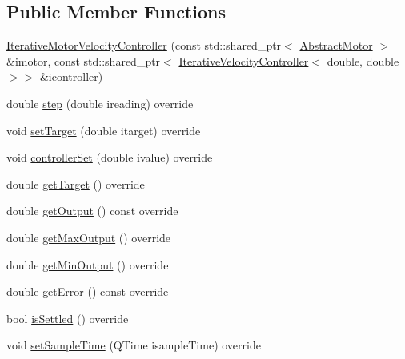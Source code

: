 \subsection*{Public Member Functions}
\begin{DoxyCompactItemize}
\item 
\mbox{\hyperlink{classokapi_1_1IterativeMotorVelocityController_a89b1a3956de3965a8552600283a1ec1b}{Iterative\+Motor\+Velocity\+Controller}} (const std\+::shared\+\_\+ptr$<$ \mbox{\hyperlink{classokapi_1_1AbstractMotor}{Abstract\+Motor}} $>$ \&imotor, const std\+::shared\+\_\+ptr$<$ \mbox{\hyperlink{classokapi_1_1IterativeVelocityController}{Iterative\+Velocity\+Controller}}$<$ double, double $>$$>$ \&icontroller)
\item 
double \mbox{\hyperlink{classokapi_1_1IterativeMotorVelocityController_a71f514d22293dc2e23de26ecd994d57c}{step}} (double ireading) override
\item 
void \mbox{\hyperlink{classokapi_1_1IterativeMotorVelocityController_a9a5a1d57df3faa75474245200ed34a18}{set\+Target}} (double itarget) override
\item 
void \mbox{\hyperlink{classokapi_1_1IterativeMotorVelocityController_a5a36064df12b3d34f2bfa09ca1992b9e}{controller\+Set}} (double ivalue) override
\item 
double \mbox{\hyperlink{classokapi_1_1IterativeMotorVelocityController_a3e54865f6b424954f3846cd1361077c5}{get\+Target}} () override
\item 
double \mbox{\hyperlink{classokapi_1_1IterativeMotorVelocityController_a078d0d0d20118e374d01d2b9eba23da3}{get\+Output}} () const override
\item 
double \mbox{\hyperlink{classokapi_1_1IterativeMotorVelocityController_a48d88a7c9cec2c7046d0f7f61d8777c9}{get\+Max\+Output}} () override
\item 
double \mbox{\hyperlink{classokapi_1_1IterativeMotorVelocityController_a32942ed7359481ede1fba86d7dc44795}{get\+Min\+Output}} () override
\item 
double \mbox{\hyperlink{classokapi_1_1IterativeMotorVelocityController_aee5e0bfdaa45c2748b9f4bf8b549f286}{get\+Error}} () const override
\item 
bool \mbox{\hyperlink{classokapi_1_1IterativeMotorVelocityController_ade18c38b1ec3196b25b0ea323d8e1075}{is\+Settled}} () override
\item 
void \mbox{\hyperlink{classokapi_1_1IterativeMotorVelocityController_ab94173452bbba03ffe51a4e700e2a870}{set\+Sample\+Time}} (Q\+Time isample\+Time) override
\item 
$$
\end{DoxyCompactItemize}
